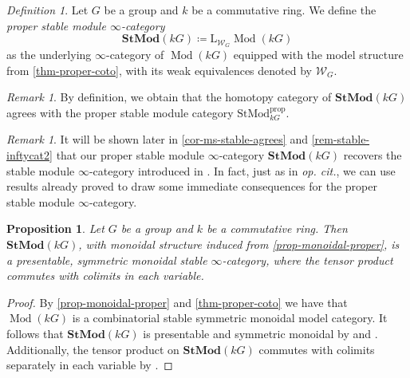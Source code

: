\documentclass{amsart}
\newcommand{\GD}[1]{{\color{ForestGreen} G: [#1]}}
\def \Wfin{{\mathcal W}_{G}}
\DeclareMathOperator{\Mod}{Mod}
\numberwithin{equation}{section}%
\newtheorem{proposition}[equation]{Proposition}
\theoremstyle{remark}
\newtheorem{definition}[equation]{Definition}
\newtheorem{remark}[equation]{Remark}
\begin{document}
{\begin{definition}\label{def-inf-proper}
   Let $G$ be a group and $k$ be a commutative ring.  We define the \textit{proper stable module $\infty$-category} 
   \[
   \mathbf{StMod}(kG)\coloneqq \mathrm{L}_{\Wfin} \Mod(kG)
   \]
   as the underlying $\infty$-category of $\Mod(kG)$ equipped with the model structure from \cref{thm-proper-coto}, with its weak equivalences denoted by $\mathcal{W}_G$.
\end{definition}

\begin{remark}
    By definition, we obtain that the homotopy category of $ \mathbf{StMod}(kG)$ agrees with the proper stable module category $\mathrm{StMod}^{\mathrm{prop}}_{kG}$. 
\end{remark}

\begin{remark}
It will be shown later in \cref{cor-ms-stable-agrees} and \cref{rem-stable-inftycat2} that our proper stable module $\infty$-category $\mathbf{StMod}(kG)$ recovers the stable module $\infty$-category introduced in \cite{Gom24}. In fact, just as in \textit{op. cit.}, we can use results already proved to draw some immediate consequences for the proper stable module $\infty$-category.   
\end{remark}


\begin{proposition}\label{prop-stmod-is-sht}
     Let $G$ be a group and $k$ be a commutative ring. Then $ \mathbf{StMod}(kG)$, with monoidal structure induced from \cref{prop-monoidal-proper}, is a presentable, symmetric monoidal stable $\infty$-category, where the tensor product commutes with colimits in each variable.
\end{proposition}

\begin{proof}
    By \cref{prop-monoidal-proper} and \cref{thm-proper-coto} we have that $\Mod(kG)$ is a
combinatorial stable symmetric monoidal model category. It follows that $\mathbf{StMod}(kG)$ is
presentable and symmetric monoidal by \cite[Proposition 1.3.4.22]{Lur17} and \cite[Example 4.1.7.6]{Lur17}. Additionally, the tensor product on $\mathbf{StMod}(kG)$ commutes
with colimits separately in each variable by \cite[Lemma 4.1.8.8]{Lur17}. 
\end{proof}

}
\end{document}
